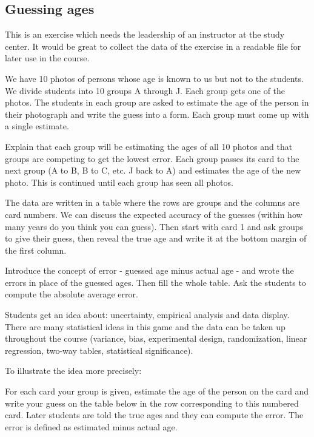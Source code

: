 \documentclass[
  letterpaper,
]{scrbook}
\begin{document}
\hypertarget{guessing-ages}{%
\subsection{Guessing ages}\label{guessing-ages}}

This is an exercise which needs the leadership of an instructor at the
study center. It would be great to collect the data of the exercise in a
readable file for later use in the course.

We have 10 photos of persons whose age is known to us but not to the
students. We divide students into 10 groups A through J. Each group gets
one of the photos. The students in each group are asked to estimate the
age of the person in their photograph and write the guess into a form.
Each group must come up with a single estimate.

Explain that each group will be estimating the ages of all 10 photos and
that groups are competing to get the lowest error. Each group passes its
card to the next group (A to B, B to C, etc. J back to A) and estimates
the age of the new photo. This is continued until each group has seen
all photos.

The data are written in a table where the rows are groups and the
columns are card numbers. We can discuss the expected accuracy of the
guesses (within how many years do you think you can guess). Then start
with card 1 and ask groups to give their guess, then reveal the true age
and write it at the bottom margin of the first column.

Introduce the concept of error - guessed age minus actual age - and
wrote the errors in place of the guessed ages. Then fill the whole
table. Ask the students to compute the absolute average error.

Students get an idea about: uncertainty, empirical analysis and data
display. There are many statistical ideas in this game and the data can
be taken up throughout the course (variance, bias, experimental design,
randomization, linear regression, two-way tables, statistical
significance).

To illustrate the idea more precisely:

For each card your group is given, estimate the age of the person on the
card and write your guess on the table below in the row corresponding to
this numbered card. Later students are told the true ages and they can
compute the error. The error is defined as estimated minus actual age.
\end{document}
